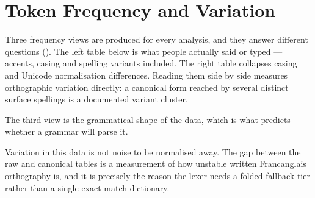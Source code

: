 \section{Token Frequency and Variation}\label{c:freq}

Three frequency views are produced for every analysis, and they answer different questions
(). The left table below is what people actually said or typed --- accents, casing
and spelling variants included. The right table collapses casing and Unicode normalisation
differences. Reading them side by side measures orthographic variation directly: a
canonical form reached by several distinct surface spellings is a documented variant
cluster.

\begin{center}
\begin{minipage}[t]{0.47\linewidth}
\centering
\end{minipage}\hfill
\begin{minipage}[t]{0.47\linewidth}
\centering
\end{minipage}
\end{center}

The third view is the grammatical shape of the data, which is what predicts whether a
grammar will parse it.

\begin{center}\end{center}

\begin{keypoint}
Variation in this data is not noise to be normalised away. The gap between the raw and
canonical tables is a measurement of how unstable written Francanglais orthography is, and
it is precisely the reason the lexer needs a folded fallback tier rather than a single
exact-match dictionary.
\end{keypoint}

